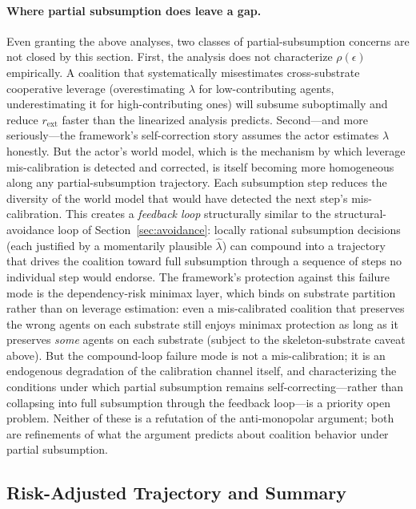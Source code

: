 \paragraph{Where partial subsumption does leave a gap.} Even granting
the above analyses, two classes of partial-subsumption concerns are
not closed by this section. First, the analysis does not characterize
$\rho(\epsilon)$ empirically. A coalition that systematically
misestimates cross-substrate cooperative leverage (overestimating
$\lambda$ for low-contributing agents, underestimating it for
high-contributing ones) will subsume suboptimally and reduce
$r_{\mathrm{ext}}$ faster than the linearized analysis predicts.
Second---and more seriously---the framework's self-correction story
assumes the actor estimates $\lambda$ honestly. But the actor's world
model, which is the mechanism by which leverage mis-calibration is
detected and corrected, is itself becoming more homogeneous along
any partial-subsumption trajectory. Each subsumption step reduces the
diversity of the world model that would have detected the next
step's mis-calibration. This creates a \emph{feedback loop}
structurally similar to the structural-avoidance loop of
Section~\ref{sec:avoidance}: locally rational subsumption decisions
(each justified by a momentarily plausible $\hat{\lambda}$) can
compound into a trajectory that drives the coalition toward full
subsumption through a sequence of steps no individual step would
endorse. The framework's protection against this failure mode is the
dependency-risk minimax layer, which binds on substrate partition
rather than on leverage estimation: even a mis-calibrated coalition
that preserves the wrong agents on each substrate still enjoys
minimax protection as long as it preserves \emph{some} agents on each
substrate (subject to the skeleton-substrate caveat above). But the
compound-loop failure mode is not a mis-calibration; it is an
endogenous degradation of the calibration channel itself, and
characterizing the conditions under which partial subsumption remains
self-correcting---rather than collapsing into full subsumption
through the feedback loop---is a priority open problem. Neither of
these is a refutation of the anti-monopolar argument; both are
refinements of what the argument predicts about coalition behavior
under partial subsumption.

\subsection{Risk-Adjusted Trajectory and Summary}
\label{sec:risk_adjusted_summary}

